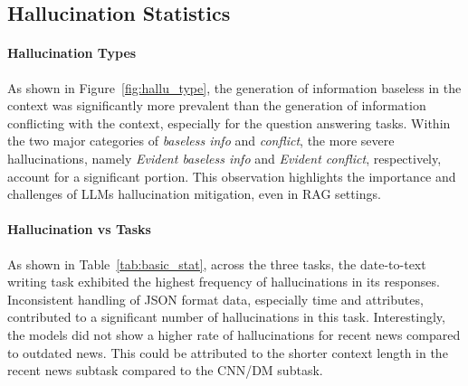 \documentclass[11pt]{article}
\begin{document}
\subsection{Hallucination Statistics}




\paragraph{Hallucination Types} As shown in Figure~\ref{fig:hallu_type}, the generation of information baseless in the context was significantly more prevalent than the generation of information conflicting with the context, especially for the question answering tasks. Within the two major categories of \textit{baseless info} and \textit{conflict}, the more severe hallucinations, namely \textit{Evident baseless info} and \textit{Evident conflict}, respectively, account for a significant portion. This observation highlights the importance and challenges of LLMs hallucination mitigation, even in RAG settings.


\paragraph{Hallucination vs Tasks} As shown in Table~\ref{tab:basic_stat}, across the three tasks, the date-to-text writing task exhibited the highest frequency of hallucinations in its responses. 
Inconsistent handling of JSON format data, especially time and attributes, contributed to a significant number of hallucinations in this task. 
Interestingly, the models did not show a higher rate of hallucinations for recent news compared to outdated news. This could be attributed to the shorter context length in the recent news subtask compared to the CNN/DM subtask.
\end{document}
